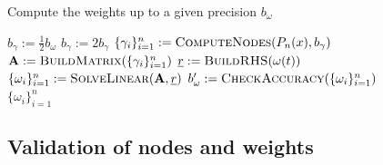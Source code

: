 \documentclass[a4paper,10pt]{article}
\begin{document}
\begin{algorithm}
  \caption{Compute the weights up to a given precision $b_{\omega}$}
  \label{alg:compute_weights}
  \begin{algorithmic}
      \State $b_{\gamma} := \frac{1}{2} b_{\omega}$
      \Repeat
        \State $b_{\gamma} := 2 b_{\gamma}$
        \State $\{\gamma_i\}_{i=1}^{n} := \textsc{ComputeNodes}(P_n(x), b_{\gamma})$
        \State $\mat{A} := \textsc{BuildMatrix}(\{\gamma_i\}_{i=1}^{n})$
        \State $\vec{r} := \textsc{BuildRHS}(\omega(t))$
        \State $\{\omega_i\}_{i=1}^{n} := \textsc{SolveLinear}(\mat{A}, \vec{r})$
        \State $b^{\prime}_{\omega} := \textsc{CheckAccuracy}(\{\omega_i\}_{i=1}^{n})$
       \\
      \Return $\{\omega_i\}_{i=1}^{n}$
    \EndProcedure
  \end{algorithmic}
\end{algorithm}


\FloatBarrier
\subsection{Validation of nodes and weights}
\label{sec:validation_nodes_weights}
\end{document}
